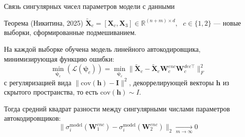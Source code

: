 \documentclass{beamer}
\begin{document}
\begin{frame}{Связь сингулярных чисел параметров модели с данными}
\begin{block}{Теорема (Никитина, 2025)}
 $\tilde{\mathbf{X}}_c = [\mathbf{X}_c, \mathbf{X}_3] \in \mathbb{R}^{(n+m) \times d}, ~~~ c \in \{1, 2\}$ --- новые выборки, сформированные подмешиванием.
 
\bigskip

На каждой выборке обучена модель линейного автокодировщика, минимизирующая функцию ошибки:
\[\min_{\boldsymbol{\psi}_c}(\mathcal{L}(\boldsymbol{\psi}_c)) = \min_{\boldsymbol{\psi}_c} \|\tilde{\mathbf{X}}_c - \tilde{\mathbf{X}}_c\mathbf{W}_{c}^{enc}\mathbf{W}_{c}^{dec\top}\|_F^2\]
\noindent с регуляризацией вида $\|\text{cov}(\mathbf{h}) - \mathbf{I}\|^2$, декоррелирующей векторы $\mathbf{h}$ из скрытого пространства, то есть $\text{cov}(\mathbf{h}) \sim I$.

\bigskip

Тогда средний квадрат разности между сингулярными числами параметров автокодировщиков:
\[
\|\sigma_i^{\text{model}}(\mathbf{W}^{enc}_1) - \sigma_i^{\text{model}}(\mathbf{W}^{enc}_2)\|_2 \underset{m \to \infty}{\longrightarrow} 0
\]
\end{block}
\end{frame}

\end{document}
